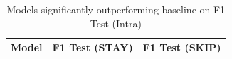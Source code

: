 \begin{table}[ht]
\centering
\begin{tabular}{lcc}
\hline
Model & F1 Test (STAY) & F1 Test (SKIP) \\
\hline
\hline
\end{tabular}
\caption{Models significantly outperforming baseline on F1 Test (Intra)}
\label{tab:sig_f1_intra_ablation}
\end{table}

\vspace{1em}